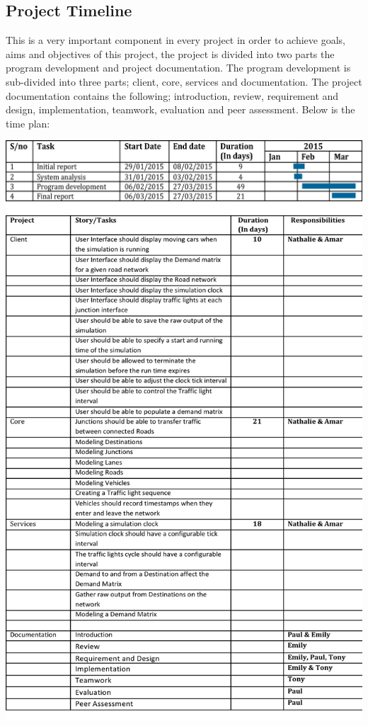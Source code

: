 

\subsection{Project Timeline}
This is a very important component in every project in order to achieve goals, aims and objectives of this project, the project is divided into two parts the program development and project documentation. The program development is sub-divided into three parts; client, core, services and documentation. The project documentation contains the following; introduction, review, requirement and design, implementation, teamwork, evaluation and peer assessment. Below is the time plan:
\begin{center}
\includegraphics[scale=0.8]{./images/ganttchart.png}
\includegraphics[scale=0.6]{./images/schedule.png}
\end{center}

